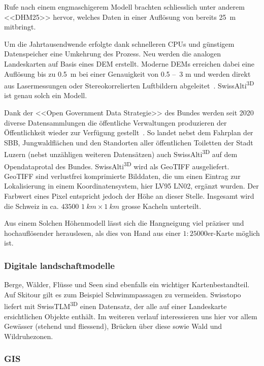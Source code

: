 Rufe nach einem engmaschigerem Modell brachten schliesslich unter anderem <<DHM25>> hervor, welches Daten in einer Auflösung von bereits \qty{25}{m} mitbringt.~\cite{swisstopohistdem}

Um die Jahrtausendwende erfolgte dank schnelleren CPUs und günstigem Datenspeicher eine Umkehrung des Prozess. Neu werden die analogen Landeskarten auf Basis eines DEM erstellt. Moderne DEMs erreichen dabei eine Auflösung bis zu \qty{0.5}{m} bei einer Genauigkeit von 0.5 --~3 \unit{m} und werden direkt aus Lasermessungen oder Stereokorrelierten Luftbildern abgeleitet~\cite{alti3dprod}. SwissAlti\textsuperscript{3D} ist genau solch ein Modell.

Dank der <<Open Government Data Strategie>> des Bundes werden seit 2020 diverse Datensammlungen die öffentliche Verwaltungen produzieren der Öffentlichkeit wieder zur Verfügung gestellt~\cite{opendataswiss}.
So landet nebst dem Fahrplan der SBB, Jungwaldflächen und den Standorten aller öffentlichen Toiletten der Stadt Luzern (nebst unzähligen weiteren Datensätzen) auch  SwissAlti\textsuperscript{3D} auf dem Opendataprotal des Bundes.
SwissAlti\textsuperscript{3D} wird als GeoTIFF ausgeliefert. GeoTIFF sind verlustfrei komprimierte Bilddaten, die um einen Eintrag zur Lokalisierung in einem Koordinatensystem, hier LV95 LN02, ergänzt wurden. Der Farbwert eines Pixel entspricht jedoch der Höhe an dieser Stelle. Insgesamt wird die Schweiz in ca. $43500$ $\qty{1}{km} \times \qty{1}{km}$ grosse Kacheln unterteilt.~\cite{alti3dprod} 

Aus einem Solchen Höhenmodell lässt sich die Hangneigung viel präziser und hochauflösender herauslesen, als dies von Hand aus einer $1:25000$er-Karte möglich ist.

\subsubsection{Digitale landschaftmodelle}

Berge, Wälder, Flüsse und Seen sind ebenfalls ein wichtiger Kartenbestandteil. Auf Skitour gilt es zum Beispiel Schwimmpassagen zu vermeiden. Swisstopo liefert mit SwissTLM\textsuperscript{3D} einen Datensatz, der alle auf einer Landeskarte ersichtlichen Objekte enthält. Im weiteren verlauf interessieren uns hier vor allem Gewässer (stehend und fliessend), Brücken über diese sowie Wald und Wildruhezonen.

\subsubsection{GIS}\label{sec:gis}

